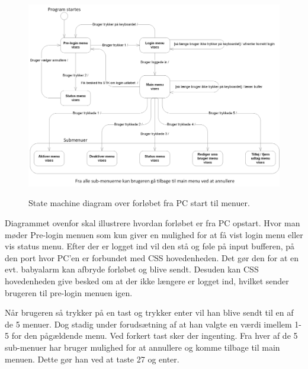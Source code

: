 \begin{figure}[!htb]
     {\includegraphics[width=\textwidth]{billeder/uml/state_machine_main}}
     \caption{State machine diagram over forløbet fra PC start til menuer.}
     \label{fig:State_machine_pc}
\end{figure}

Diagrammet ovenfor skal illustrere hvordan forløbet er fra PC opstart. Hvor man møder Pre-login menuen som kun giver en mulighed for at få vist login menu eller vis status menu. Efter der er logget ind vil den stå og føle på input bufferen, på den port hvor PC'en er forbundet med CSS hovedenheden. Det gør den for at en evt. babyalarm kan afbryde forløbet og blive sendt. Desuden kan CSS hovedenheden give besked om at der ikke længere er logget ind, hvilket sender brugeren til pre-login menuen igen.

\medskip

Når brugeren så trykker på en tast og trykker enter vil han blive sendt til en af de 5 menuer. Dog stadig under forudsætning af at han valgte en værdi imellem 1-5 for den pågældende menu. Ved forkert tast sker der ingenting. Fra hver af de 5 sub-menuer har bruger mulighed for at annullere og komme tilbage til main menuen. Dette gør han ved at taste 27 og enter.


\clearpage

